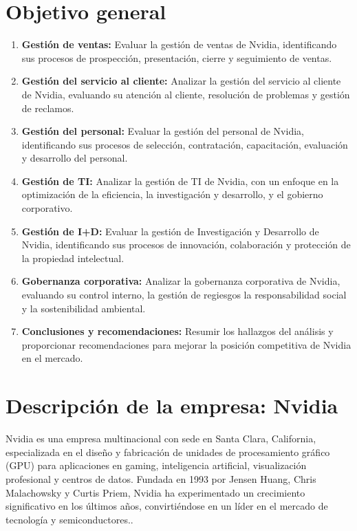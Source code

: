 \documentclass{article}
\newenvironment{objetivoGeneral}{\section{Objetivo general}}{}
\begin{document}
\begin{objetivoGeneral}
\begin{multicols}{2}
\begin{enumerate}
      \item \textbf{Gestión de ventas:} Evaluar la gestión de ventas de Nvidia, identificando sus procesos de prospección, presentación, cierre y seguimiento de ventas.
      \item \textbf{Gestión del servicio al cliente:} Analizar la gestión del servicio al cliente de Nvidia, evaluando su atención al cliente, resolución de problemas y gestión de reclamos.
      \item \textbf{Gestión del personal:} Evaluar la gestión del personal de Nvidia, identificando sus procesos de selección, contratación, capacitación, evaluación y desarrollo del personal.
      \item \textbf{Gestión de TI:} Analizar la gestión de TI de Nvidia, con un enfoque en la optimización de la eficiencia, la investigación y desarrollo, y el gobierno corporativo.
      \item \textbf{Gestión de I+D:} Evaluar la gestión de Investigación y Desarrollo de Nvidia, identificando sus procesos de innovación, colaboración y protección de la propiedad intelectual.
      \item \textbf{Gobernanza corporativa:} Analizar la gobernanza corporativa de Nvidia, evaluando su control interno, la gestión de regiesgos la responsabilidad social y la sostenibilidad ambiental.
      \item \textbf{Conclusiones y recomendaciones:} Resumir los hallazgos del análisis y proporcionar recomendaciones para mejorar la posición competitiva de Nvidia en el mercado.
    \end{enumerate}    
  \end{multicols}
\end{objetivoGeneral}

\newpage

\section{Descripción de la empresa: Nvidia}

Nvidia es una empresa multinacional con sede en Santa Clara, California, especializada en el diseño y fabricación de unidades de procesamiento gráfico (GPU) para aplicaciones en gaming, inteligencia artificial, visualización profesional y centros de datos. Fundada en 1993 por Jensen Huang, Chris Malachowsky y Curtis Priem, Nvidia ha experimentado un crecimiento significativo en los últimos años, convirtiéndose en un líder en el mercado de tecnología y semiconductores..
\end{document}
